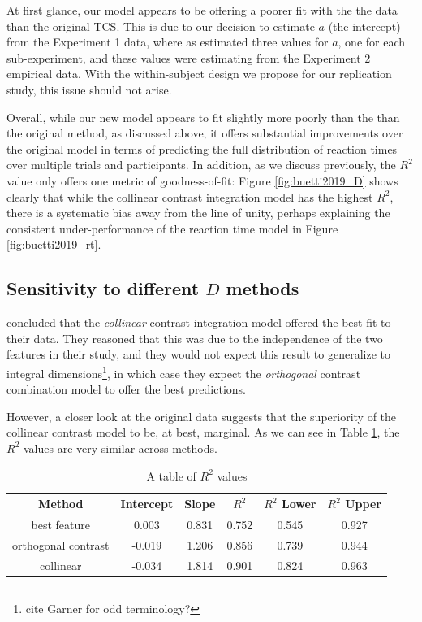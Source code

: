\documentclass[smallextended, natbib]{svjour3}       %
\begin{document}
At first glance, our model appears to be offering a poorer fit with the the data than the original TCS. This is due to our decision to estimate $a$ (the intercept) from the Experiment 1 data, where as \cite{buetti2019predicting} estimated three values for $a$, one for each sub-experiment, and these values were estimating from the Experiment 2 empirical data. With the within-subject design we propose for our replication study, this issue should not arise. 

Overall, while our new model appears to fit slightly more poorly than the than the original method, as discussed above, it offers substantial improvements over the original model in terms of predicting the full distribution of reaction times over multiple trials and participants. In addition, as we discuss previously, the $R^2$ value only offers one metric of goodness-of-fit: Figure \ref{fig:buetti2019_D} shows clearly that while the collinear contrast integration model has the highest $R^2$, there is a systematic bias away from the line of unity, perhaps explaining the consistent under-performance of the reaction time model in Figure \ref{fig:buetti2019_rt}.

\subsection{Sensitivity to different $D$ methods}

\cite{buetti2019predicting} concluded that the \textit{collinear} contrast integration model offered the best fit to their data. They reasoned that this was due to the independence of the two features in their study, and they would not expect this result to generalize to integral dimensions\footnote{cite Garner for odd terminology?}, in which case they expect the \textit{orthogonal} contrast combination model to offer the best predictions.

However, a closer look at the original data suggests that the superiority of the collinear contrast model to be, at best, marginal. As we can see in Table \ref{tab:reimp_D_r2}, the $R^2$ values are very similar across methods. 

\begin{table}
\centering
\begin{tabular}{ c|c|c|c|c|c } 
Method & Intercept & Slope & $R^2$ & $R^2$ Lower & $R^2$ Upper \\
 \hline 
best feature & 0.003 & 0.831 & 0.752 & 0.545 & 0.927\\ 
 orthogonal contrast & -0.019 & 1.206 & 0.856 & 0.739 & 0.944\\ 
 collinear & -0.034 & 1.814	& 0.901 & 0.824 & 0.963\\
\end{tabular}
\caption{A table of $R^2$ values}
\label{tab:reimp_D_r2}
\end{table}
\end{document}
